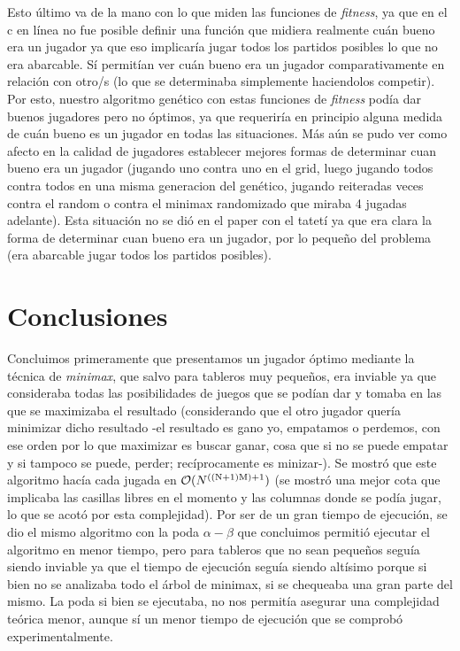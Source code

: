 \documentclass[A4paper,oneside,fleqn,11pt]{article}
\theoremstyle{definition}
\begin{document}
Esto último va de la mano con lo que miden las funciones de \textit{fitness}, ya que en el c en línea no fue posible definir una función que midiera realmente cuán bueno era un jugador ya que eso implicaría jugar todos los partidos posibles lo que no era abarcable. Sí permitían ver cuán bueno era un jugador comparativamente en relación con otro/s (lo que se determinaba simplemente haciendolos competir). Por esto, nuestro algoritmo genético con estas funciones de \textit{fitness} podía dar buenos jugadores pero no óptimos, ya que requeriría en principio alguna medida de cuán bueno es un jugador en todas las situaciones. Más aún se pudo ver como afecto en la calidad de jugadores establecer mejores formas de determinar cuan bueno era un jugador (jugando uno contra uno en el grid, luego jugando todos contra todos en una misma generacion del genético, jugando reiteradas veces contra el random o contra el minimax randomizado que miraba 4 jugadas adelante). Esta situación no se dió en el paper con el tatetí ya que era clara la forma de determinar cuan bueno era un jugador, por lo pequeño del problema (era abarcable jugar todos los partidos posibles).

\section{Conclusiones}

Concluimos primeramente que presentamos un jugador óptimo mediante la técnica de\textit{ minimax}, que salvo para tableros muy pequeños, era inviable ya que consideraba todas las posibilidades de juegos que se podían dar y tomaba en las que se maximizaba el resultado (considerando que el otro jugador quería minimizar dicho resultado -el resultado es gano yo, empatamos o perdemos, con ese orden por lo que maximizar es buscar ganar, cosa que si no se puede empatar y si tampoco se puede, perder; recíprocamente es minizar-). Se mostró que este algoritmo hacía cada jugada en $\mathcal{O}(N\textsuperscript{((N+1)M)+1})$ (se mostró una mejor cota que implicaba las casillas libres en el momento y las columnas donde se podía jugar, lo que se acotó por esta complejidad). Por ser de un gran tiempo de ejecución, se dio el mismo algoritmo con la poda $\alpha - \beta$ que concluimos permitió ejecutar el algoritmo en menor tiempo, pero para tableros que no sean pequeños seguía siendo inviable ya que el tiempo de ejecución seguía siendo altísimo porque si bien no se analizaba todo el árbol de minimax, si se chequeaba una gran parte del mismo. La poda si bien se ejecutaba, no nos permitía asegurar una complejidad teórica menor, aunque sí un menor tiempo de ejecución que se comprobó experimentalmente.
\end{document}
